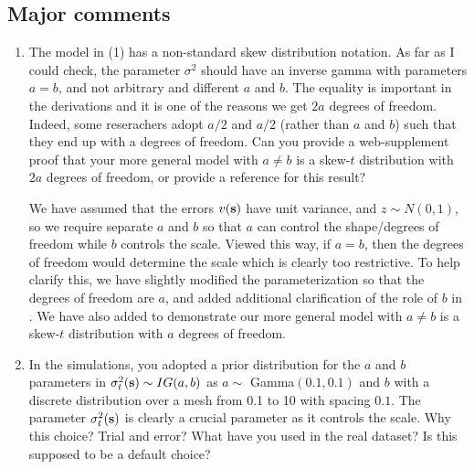 \documentclass[11pt]{article}
\begin{document}
\subsection*{Major comments}
\begin{enumerate}[1.]
\item The model in (1) has a non-standard skew distribution notation. As far as I could check, the parameter $\sigma^2$ should have an inverse gamma with parameters $a = b$, and not arbitrary and different $a$ and $b$. The equality is important in the derivations and it is one of the reasons we get $2a$ degrees of freedom. Indeed, some reserachers adopt $a/2$ and $a/2$ (rather than $a$ and $b$) such that they end up with a degrees of freedom. Can you provide a web-supplement proof that your more general model with $a \neq b$ is a skew-$t$ distribution with $2a$ degrees of freedom, or provide a reference for this result?\\

\begin{response}
  We have assumed that the errors $v(\mbox{\bf s})$ have unit variance, and $z \sim N(0, 1)$, so we require separate $a$ and $b$ so that $a$ can control the shape/degrees of freedom while $b$ controls the scale.
  Viewed this way, if $a = b$, then the degrees of freedom would determine the scale which is clearly too restrictive.
  To help clarify this, we have slightly modified the parameterization so that the degrees of freedom are $a$, and added additional clarification of the role of $b$ in .
  We have also added  to demonstrate our more general model with $a \neq b$ is a skew-$t$ distribution with $a$ degrees of freedom.
\end{response}

\item In the simulations, you adopted a prior distribution for the $a$ and $b$ parameters in $\sigma_t^2 (\mbox{\bf s}) \sim IG(a, b)$ as $a \sim$ Gamma$(0.1, 0.1)$ and $b$ with a discrete distribution over a mesh from 0.1 to 10 with spacing $0.1$. The parameter $\sigma_t^2(\mbox{\bf s})$ is clearly a crucial parameter as it controls the scale. Why this choice? Trial and error? What have you used in the real dataset? Is this supposed to be a default choice?\\


\end{enumerate}
\end{document}
